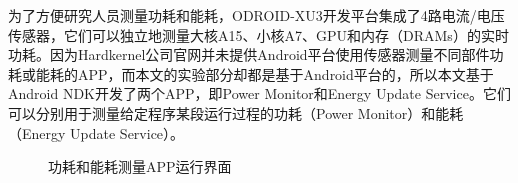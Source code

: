 为了方便研究人员测量功耗和能耗，ODROID-XU3开发平台集成了4路电流/电压传感器，它们可以独立地测量大核A15、小核A7、GPU和内存（DRAMs）的实时功耗。因为Hardkernel公司官网并未提供Android平台使用传感器测量不同部件功耗或能耗的APP，而本文的实验部分却都是基于Android平台的，所以本文基于Android NDK开发了两个APP，即Power Monitor和Energy Update Service。它们可以分别用于测量给定程序某段运行过程的功耗（Power Monitor）和能耗（Energy Update Service）。

\begin{figure}[htbp]
\centering
{}
\caption{功耗和能耗测量APP运行界面}
\label{fig:subfig}
\end{figure}

